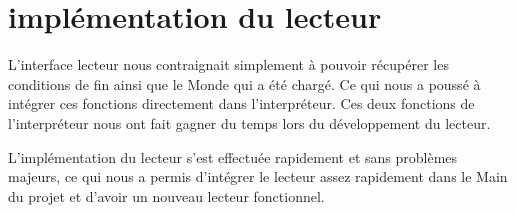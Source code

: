 \section{implémentation du lecteur}
L'interface lecteur nous contraignait simplement à pouvoir récupérer les conditions de fin ainsi que le Monde qui a été chargé. Ce qui nous a poussé à intégrer ces fonctions directement dans l'interpréteur. Ces deux fonctions de l'interpréteur nous ont fait gagner du temps lors du développement du lecteur.

L'implémentation du lecteur s'est effectuée rapidement et sans problèmes majeurs, ce qui nous a permis d'intégrer le lecteur assez rapidement dans le Main du projet et d'avoir un nouveau lecteur fonctionnel.
